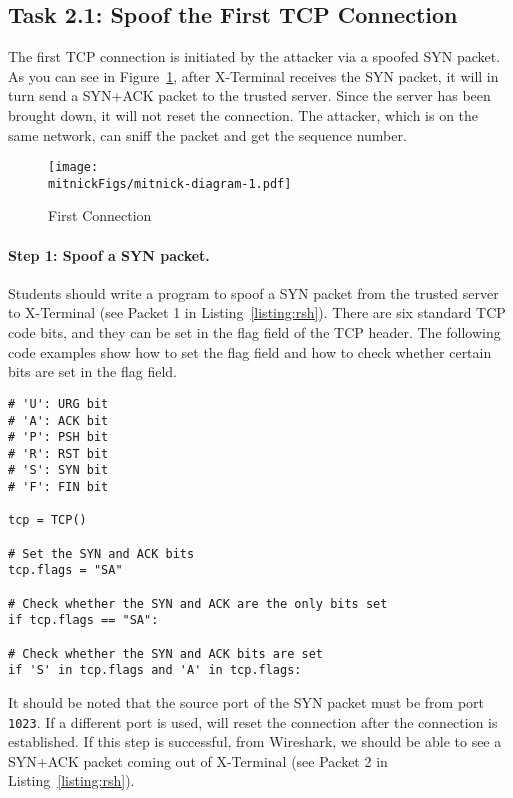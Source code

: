 \subsection{Task 2.1: Spoof the First TCP Connection}
\label{sec:first-conn}

The first TCP connection is initiated by the attacker via a spoofed SYN packet. As you can see
in Figure~\ref{fig:first-conn}, after X-Terminal receives the SYN packet, it will in turn send
a SYN+ACK packet to the trusted server. Since the server has been brought down, it will not
reset the connection. The attacker, which is on the same network, can sniff the packet and get
the sequence number.

\begin{figure}[htb]
\centering
\texttt{[image: \\mitnickFigs/mitnick-diagram-1.pdf]}
\caption{First Connection}
\label{fig:first-conn}
\end{figure}


\paragraph{Step 1: Spoof a SYN packet.}
Students should write a program to spoof a SYN packet 
from the trusted server to X-Terminal (see Packet 1 in Listing~\ref{listing:rsh}). 
There are six standard 
TCP code bits, and they can be set in the flag field of the TCP header. 
The following code examples show how to set the flag field
and how to check whether certain bits are set in
the flag field. 

\begin{lstlisting}
# 'U': URG bit
# 'A': ACK bit
# 'P': PSH bit
# 'R': RST bit
# 'S': SYN bit
# 'F': FIN bit

tcp = TCP()

# Set the SYN and ACK bits
tcp.flags = "SA"

# Check whether the SYN and ACK are the only bits set
if tcp.flags == "SA": 

# Check whether the SYN and ACK bits are set
if 'S' in tcp.flags and 'A' in tcp.flags: 
\end{lstlisting}

It should be noted that the source port of the SYN packet 
must be from port \texttt{1023}. If a different port 
is used, \rsh will reset the connection 
after the connection is established.  If this step is successful, 
from Wireshark, we should be
able to see a SYN+ACK packet coming out of 
X-Terminal (see Packet 2 in Listing~\ref{listing:rsh}).


